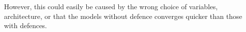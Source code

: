 However, this could easily be caused by the wrong choice of variables, architecture, or that the models without defence converges quicker than those with defences.


